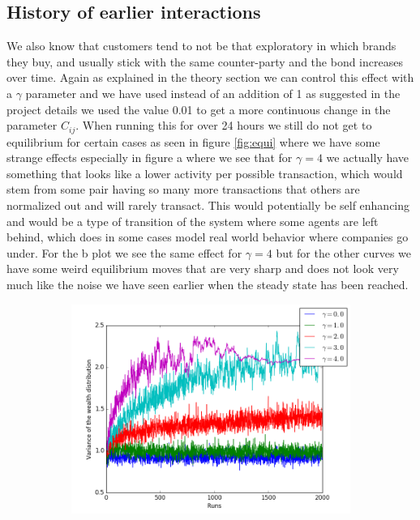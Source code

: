 \documentclass[a4paper,11pt]{article}
\begin{document}
{\subsection{History of earlier interactions}
We also know that customers tend to not be that exploratory in which brands they buy, and usually stick with the same counter-party and the bond increases over time.  Again as explained in the theory section we can control this effect with a $\gamma$ parameter and we have used instead of an addition of 1 as suggested in the project details we used the value 0.01 to get a more continuous change in the parameter $C_{ij}$. When running this for over 24 hours we still do not get to equilibrium for certain cases as seen in figure \ref{fig:equi} where we have some strange effects especially in figure a where we see that for $\gamma=4$ we actually have something that looks like a lower activity per possible transaction, which would stem from some pair having so many more transactions that others are normalized out and will rarely transact. This would potentially be self enhancing and would be a type of transition of the system where some agents are left behind, which does in some cases model real world behavior where companies go under. For the b plot we see the same effect for $\gamma=4$ but for the other curves we have some weird equilibrium moves that are very sharp and does not look very much like the noise we have seen earlier when the steady state has been reached. 
\begin{figure}[H]
	\centering
	\begin{subfigure}[t]{0.45\textwidth}
		\includegraphics[scale=0.4]{historic_lambda=0_5_alpha=1init}

\end{subfigure}
\end{figure}}
\end{document}

